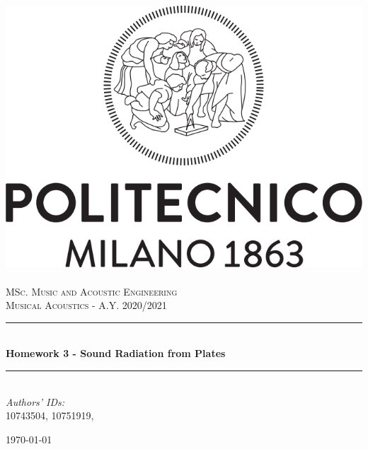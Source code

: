 \documentclass[a4paper]{article}
\title{}
\author{}
\begin{document}
\begin{titlepage}	
	\newcommand{\HRule}{\rule{\linewidth}{0.5mm}} %
	
	\center %
	
	
	\includegraphics[width=.4\textwidth]{Logo_Politecnico_Milano.png}\\[0.4cm]
	\textsc{\LARGE}\\[0.3cm] %
	
	\textsc{\large MSc. Music and Acoustic Engineering}\\[1cm] %
	
	\textsc{\Large Musical Acoustics - A.Y. 2020/2021}\\[0.5cm] %
	
	
	\HRule\\[0.4cm]
	
	{\huge\bfseries Homework 3 - Sound Radiation from Plates}\\[0.4cm] %
	
	\HRule\\[1.5cm]
	
	
	
	{\large\textit{Authors' IDs:}}\\
	10743504, 10751919, %
	
	
	\vfill\vfill\vfill %
	
	{\large\today} %
	
	
	\vfill\vfill
	
	
	\vfill %
	
	
\end{titlepage}
\end{document}
